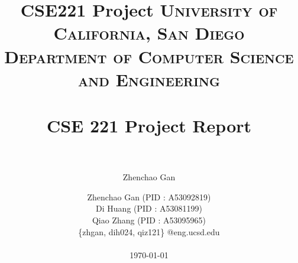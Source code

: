 \documentclass[12pt]{third-rep}
\title{CSE221 Project}
\author{Zhenchao Gan}
\title{
		\vspace{-0.5in} 	
		\usefont{OT1}{bch}{b}{n}
		\normalfont \normalsize \textsc{University of California, San Diego \\
								Department of Computer Science and Engineering } \\ [25pt]
		\horrule{0.5pt} \\[0.4cm]
		\huge CSE 221 Project Report\\
		\horrule{2pt} \\[0.5cm]
}
\author{
		\normalfont 						\normalsize
        				Zhenchao Gan  (PID : A53092819)\\[-3pt]		\normalsize
				Di Huang (PID : A53081199)\\[-3pt]		\normalsize
        				Qiao Zhang (PID : A53095965)\\[-3pt]				\normalsize
				\{zhgan, dih024, qiz121\} @eng.ucsd.edu \\ \\
       		 \today
}
\date{}
\begin{document}
\maketitle

\pagebreak

\tableofcontents





%
%




\end{document}

